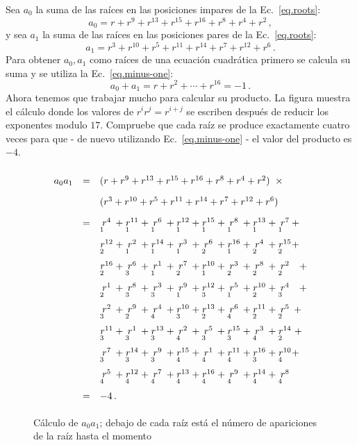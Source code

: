 Sea $a_0$ la suma de las raíces en las posiciones impares de la Ec.~\ref{eq.roots}:
\[
a_0=r + r^9 + r^{13} +r^{15} +r^{16} + r^8+r^4+r^2\,,
\]
y sea $a_1$ la suma de las raíces en las posiciones pares de la Ec.~\ref{eq.roots}:
\[
a_1=r^3 + r^{10} + r^{5} +r^{11} +r^{14} + r^7+r^{12}+r^6\,.
\]
Para obtener $a_0,a_1$ como raíces de una ecuación cuadrática primero se calcula su suma y se utiliza la Ec.~\ref{eq.minus-one}:
\[
a_0+a_1=r + r^2 + \cdots +r^{16}=-1\,.
\]
Ahora tenemos que trabajar mucho para calcular su producto. La figura muestra el cálculo donde los valores de $r^ir^j=r^{i+j}$ se escriben después de reducir los exponentes modulo $17$. Compruebe que cada raíz se produce exactamente cuatro veces para que - de nuevo utilizando Ec.~\ref{eq.minus-one} - el valor del producto es $-4$.

\begin{figure}[t]
\[
\renewcommand{\arraystretch}{1.8}
\begin{array}{lcl}
a_0a_1&=&(r + r^9 + r^{13} +r^{15} +r^{16} + r^8+r^4+r^2)\;\;\times\\
&&(r^3 + r^{10} + r^{5} +r^{11} +r^{14} + r^7+r^{12}+r^6)\\
&=&\occ{4}{1} + \occ{11}{1} + \occ{6}{1} + \occ{12}{1} + \occ{15}{1} + \occ{8}{1} + \occ{13}{1} + \occ{7}{1} +\\
&&\occ{12}{2} + \occ{2}{1} + \occ{14}{1} + \occ{3}{1} + \occ{6}{2} + \occ{16}{1} + \occ{4}{2} + \occ{15}{2} +\\
&&\occ{16}{2} + \occ{6}{3} + \occ{1}{1} + \occ{7}{2} + \occ{10}{1} + \occ{3}{2} + \occ{8}{2} + \occ{2}{2}\;\;\: +\\
&&\occ{1}{2} + \occ{8}{3} + \occ{3}{3} + \occ{9}{1} + \occ{12}{3} + \occ{5}{1} + \occ{10}{2} + \occ{4}{3}\;\;\: +\\
&&\occ{2}{3} + \occ{9}{2} + \occ{4}{4} + \occ{10}{3} + \occ{13}{2} + \occ{6}{4} + \occ{11}{2} + \occ{5}{2} \:+\\
&&\occ{11}{3} + \occ{1}{3} + \occ{13}{3} + \occ{2}{4} + \occ{5}{3} + \occ{15}{3} + \occ{3}{4} + \occ{14}{2} \;+\\
&&\occ{7}{3} + \occ{14}{3} + \occ{9}{3} + \occ{15}{4} + \occ{1}{4} + \occ{11}{4} + \occ{16}{3} + \occ{10}{4} +\\
&&\occ{5}{4} + \occ{12}{4} + \occ{7}{4} + \occ{13}{4} + \occ{16}{4} + \occ{9}{4} + \occ{14}{4} + \occ{8}{4}\\
&=&-4\,.
\end{array}
\]
\caption{Cálculo de $a_0a_1$; debajo de cada raíz está el número de apariciones de la raíz hasta el momento}\label{fig.a0a1}
\end{figure}

